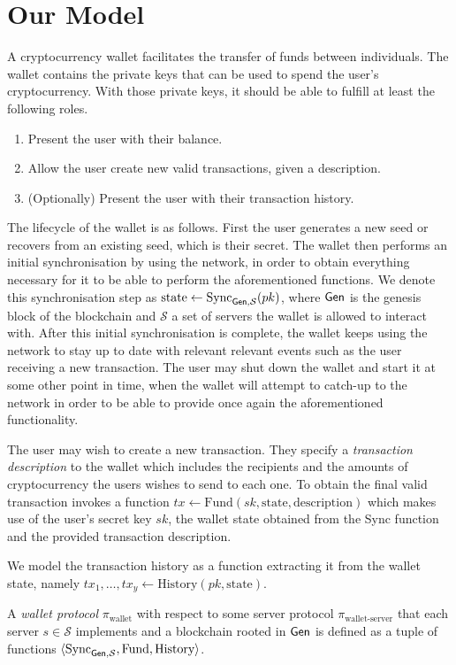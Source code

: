 \section{Our Model}
A cryptocurrency wallet facilitates the transfer of funds between individuals. The wallet contains the private keys that can be used to spend the user's cryptocurrency. With those private keys, it should be able to fulfill at least the following roles.

\begin{enumerate}
    \item Present the user with their balance.
    \item Allow the user create new valid transactions, given a description.
    \item (Optionally) Present the user with their transaction history.
\end{enumerate}

The lifecycle of the wallet is as follows. First the user generates a new seed or recovers from an existing seed, which is their secret. The wallet then performs an initial synchronisation by using the network, in order to obtain everything necessary for it to be able to perform the aforementioned functions. We denote this synchronisation step as $\text{state} \gets \text{Sync}_{\textsf{Gen}, \mathcal{S}}(pk)$, where $\textsf{Gen}$ is the genesis block of the blockchain and $\mathcal{S}$ a set of servers the wallet is allowed to interact with. After this initial synchronisation is complete, the wallet keeps using the network to stay up to date with relevant relevant events such as the user receiving a new transaction. The user may shut down the wallet and start it at some other point in time, when the wallet will attempt to catch-up to the network in order to be able to provide once again the aforementioned functionality.

The user may wish to create a new transaction. They specify a \emph{transaction description} to the wallet which includes the recipients and the amounts of cryptocurrency the users wishes to send to each one. To obtain the final valid transaction invokes a function $tx \gets \text{Fund}(sk, \text{state}, \text{description})$ which makes use of the user's secret key $sk$, the wallet state obtained from the Sync function and the provided transaction description.

We model the transaction history as a function extracting it from the wallet state, namely $tx_1, \dots, tx_y \gets \text{History}(pk, \text{state})$.

\begin{definition}
A \emph{wallet protocol} $\pi_\text{wallet}$ with respect to some server protocol $\pi_\text{wallet-server}$ that each server $s \in \mathcal{S}$ implements and a blockchain rooted in $\textsf{Gen}$ is defined as a tuple of functions $\langle\text{Sync}_{\textsf{Gen}, \mathcal{S}}, \text{Fund}, \text{History}\rangle$.
\end{definition}
